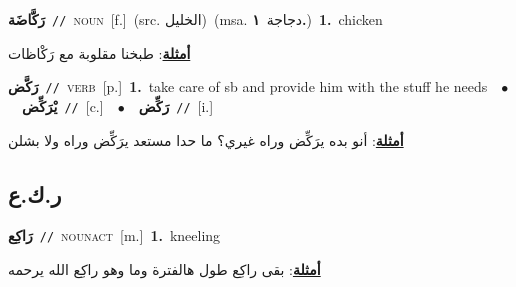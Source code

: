 \documentclass[10pt,a4paper,twoside]{article} %
\begin{document}
\begin{multicols}{2}
{\setlength\topsep{0pt}\textbf{\foreignlanguage{arabic}{رَكَّاضَة}}\ {\color{gray}\texttt{//}\color{black}}\ \textsc{noun}\ [f.]\ (src. \color{gray}\foreignlanguage{arabic}{الخليل}\color{black})\ \color{gray}(msa. \foreignlanguage{arabic}{دجاجة}~\foreignlanguage{arabic}{\textbf{١.}})\color{black}\ \textbf{1.}~chicken\  \begin{flushright}\color{gray}\foreignlanguage{arabic}{\textbf{\underline{\foreignlanguage{arabic}{أمثلة}}}: طبخنا مقلوبة مع رَكْاظات}\end{flushright}\color{black}} \vspace{2mm}

{\setlength\topsep{0pt}\textbf{\foreignlanguage{arabic}{رَكَّض}}\ {\color{gray}\texttt{//}\color{black}}\ \textsc{verb}\ [p.]\ \textbf{1.}~take care of sb and provide him with the stuff he needs\ \ $\bullet$\ \ \setlength\topsep{0pt}\textbf{\foreignlanguage{arabic}{يْرَكِّض}}\ {\color{gray}\texttt{//}\color{black}}\ [c.]\ \ $\bullet$\ \ \setlength\topsep{0pt}\textbf{\foreignlanguage{arabic}{رَكِّض}}\ {\color{gray}\texttt{//}\color{black}}\ [i.]\  \begin{flushright}\color{gray}\foreignlanguage{arabic}{\textbf{\underline{\foreignlanguage{arabic}{أمثلة}}}: أنو بده يرَكِّض وراه غيري؟ ما حدا مستعد يرَكِّض وراه ولا بشلن}\end{flushright}\color{black}} \vspace{2mm}

\vspace{-3mm}
\subsection*{\color{blue}\foreignlanguage{arabic}{ر.ك.ع}\color{blue}{}} 

{\setlength\topsep{0pt}\textbf{\foreignlanguage{arabic}{رَاكِع}}\ {\color{gray}\texttt{//}\color{black}}\ \textsc{noun\textunderscore act}\ [m.]\ \textbf{1.}~kneeling\  \begin{flushright}\color{gray}\foreignlanguage{arabic}{\textbf{\underline{\foreignlanguage{arabic}{أمثلة}}}: بقى راكِع طول هالفترة وما وهو راكِع الله يرحمه}\end{flushright}\color{black}} \vspace{2mm}


\end{multicols}
\end{document}
